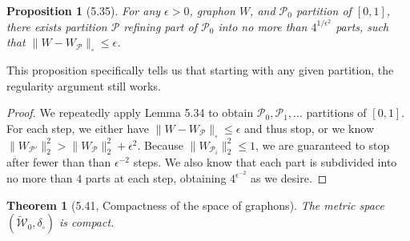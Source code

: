 \documentclass[UTF8,11pt]{ctexart}
\newtheorem*{theorem}{Theorem}
\newtheorem*{proposition}{Proposition}
\theoremstyle{definition}
\begin{document}
\begin{proposition}[5.35]
For any $\epsilon>0$, graphon $W$, and $\mathcal P_0$ partition of $[0,1]$, there exists partition $\mathcal P$ refining part of $\mathcal P_0$ into no more than $4^{1/\epsilon^2}$ parts, such that $\|W-W_{\mathcal P}\|_\square\leq\epsilon$.
\end{proposition}
This proposition specifically tells us that starting with any given partition, the regularity argument still works.
\begin{proof}
We repeatedly apply Lemma 5.34 to obtain $\mathcal P_0,\mathcal P_1,\ldots$ partitions of $[0,1]$. For each step, we either have $\|W-W_{\mathcal P}\|_\square\leq\epsilon$ and thus stop, or we know $\|W_{\mathcal P'}\|_2^2>\|W_{\mathcal P}\|_2^2+\epsilon^2$. Because $\|W_{\mathcal P_i}\|_2^2\leq1$, we are guaranteed to stop after fewer than than $\epsilon^{-2}$ steps. We also know that each part is subdivided into no more than $4$ parts at each step, obtaining $4^{\epsilon^{-2}}$ as we desire.
\end{proof}
\begin{theorem}[5.41, Compactness of the space of graphons]
The metric space $(\widetilde{\mathcal W}_0,\delta_\square)$ is compact.
\end{theorem}
\end{document}
